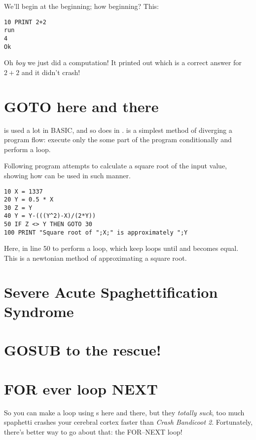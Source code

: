 \quad
{}

We'll begin at the beginning; how beginning? This:

\begin{lstlisting}
10 PRINT 2+2
run
4
Ok
\end{lstlisting}

Oh \emph{boy} we just did a computation! It printed out  which is a correct answer for $2+2$ and it didn't crash!

\section[GOTO]{GOTO here and there}

 is used a lot in BASIC, and so does in \tbas.  is a simplest method of diverging a program flow: execute only the some part of the program conditionally and perform a loop.

Following program attempts to calculate a square root of the input value,  showing how  can be used in such manner.

\begin{lstlisting}
10 X = 1337
20 Y = 0.5 * X
30 Z = Y
40 Y = Y-(((Y^2)-X)/(2*Y))
50 IF Z <> Y THEN GOTO 30
100 PRINT "Square root of ";X;" is approximately ";Y
\end{lstlisting}

Here,  in line 50 to perform a loop, which keep loops until  and  becomes equal. This is a newtonian method of approximating a square root. 

\section[When GOTO Is Bad]{Severe Acute Spaghettification Syndrome}
\section[Subroutine with GOSUB]{GOSUB to the rescue!}

\section[FOR--NEXT Loop]{FOR ever loop NEXT}

So you can make a loop using s here and there, but they \emph{totally suck}, too much spaphetti crashes your cerebral cortex faster than \emph{Crash Bandicoot 2}. Fortunately, there's better way to go about that: the FOR--NEXT loop!

